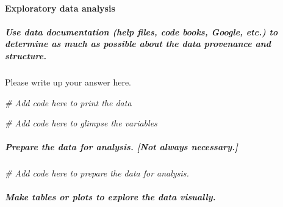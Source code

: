 \documentclass[
]{book}
\newenvironment{Shaded}{\begin{snugshade}}{\end{snugshade}}
\newcommand{\CommentTok}[1]{\textcolor[rgb]{0.56,0.35,0.01}{\textit{#1}}}
\begin{document}
\hypertarget{exploratory-data-analysis-2}{%
\paragraph*{Exploratory data analysis}\label{exploratory-data-analysis-2}}

\hypertarget{use-data-documentation-help-files-code-books-google-etc.-to-determine-as-much-as-possible-about-the-data-provenance-and-structure.-2}{%
\subparagraph*{Use data documentation (help files, code books, Google, etc.) to determine as much as possible about the data provenance and structure.}\label{use-data-documentation-help-files-code-books-google-etc.-to-determine-as-much-as-possible-about-the-data-provenance-and-structure.-2}}

Please write up your answer here.

\begin{Shaded}
\begin{Highlighting}[]
\CommentTok{\# Add code here to print the data}
\end{Highlighting}
\end{Shaded}

\begin{Shaded}
\begin{Highlighting}[]
\CommentTok{\# Add code here to glimpse the variables}
\end{Highlighting}
\end{Shaded}

\hypertarget{prepare-the-data-for-analysis.-not-always-necessary.-2}{%
\subparagraph*{Prepare the data for analysis. {[}Not always necessary.{]}}\label{prepare-the-data-for-analysis.-not-always-necessary.-2}}

\begin{Shaded}
\begin{Highlighting}[]
\CommentTok{\# Add code here to prepare the data for analysis.}
\end{Highlighting}
\end{Shaded}

\hypertarget{make-tables-or-plots-to-explore-the-data-visually.-2}{%
\subparagraph*{Make tables or plots to explore the data visually.}\label{make-tables-or-plots-to-explore-the-data-visually.-2}}
\end{document}
